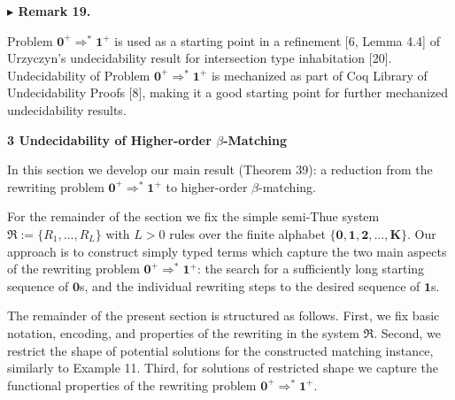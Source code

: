  
 
 
\par\medskip\noindent\textbf{$\blacktriangleright$ Remark 19.}\par
 
 
Problem $\mathbf{0}^{+}\Rightarrow^{*}\mathbf{1}^{+}$ is used as a starting point in a refinement [6, Lemma 4.4] of Urzyczyn’s undecidability result for intersection type inhabitation [20]. Undecidability of Problem $\mathbf{0}^{+}\Rightarrow^{*}\mathbf{1}^{+}$ is mechanized as part of Coq Library of Undecidability Proofs [8], making it a good starting point for further mechanized undecidability results.\par
 
 
 
 


 
\par\medskip\noindent\textbf{3 Undecidability of Higher-order $\beta$-Matching}\par
 
 
In this section we develop our main result (Theorem 39): a reduction from the rewriting problem $\mathbf{0}^{+}\Rightarrow^{*}\mathbf{1}^{+}$ to higher-order $\beta$-matching.\par
 
 
 
For the remainder of the section we fix the simple semi-Thue system $\mathfrak{R}:=\{R_{1},\ldots,R_{L}\}$ with $L>0$ rules over the finite alphabet $\{\mathbf{0},\mathbf{1},\mathbf{2},\ldots,\mathbf{K}\}$. Our approach is to construct simply typed terms which capture the two main aspects of the rewriting problem $\mathbf{0}^{+}\Rightarrow^{*}\mathbf{1}^{+}$: the search for a sufficiently long starting sequence of $\mathbf{0}$s, and the individual rewriting steps to the desired sequence of $\mathbf{1}$s.\par
 
 
 
The remainder of the present section is structured as follows. First, we fix basic notation, encoding, and properties of the rewriting in the system $\mathfrak{R}$. Second, we restrict the shape of potential solutions for the constructed matching instance, similarly to Example 11. Third, for solutions of restricted shape we capture the functional properties of the rewriting problem $\mathbf{0}^{+}\Rightarrow^{*}\mathbf{1}^{+}$.\par
 
